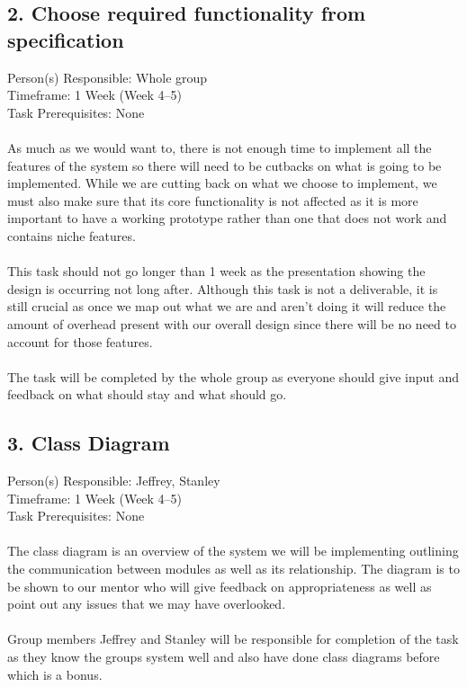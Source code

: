 \subsection{2. Choose required functionality from specification}
\label{chooserequiredfunctionalityfromspecification}

Person(s) Responsible: Whole group
 \\ Timeframe: 1 Week (Week 4--5)
 \\ Task Prerequisites: None
 \\ \\ As much as we would want to, there is not enough time to implement all the features of the system so there will need to be cutbacks on what is going to be implemented. While we are cutting back on what we choose to implement, we must also make sure that its core functionality is not affected as it is more important to have a working prototype rather than one that does not work and contains niche features.
 \\ \\ This task should not go longer than 1 week as the presentation showing the design is occurring not long after. Although this task is not a deliverable, it is still crucial as once we map out what we are and aren't doing it will reduce the amount of overhead present with our overall design since there will be no need to account for those features.
 \\ \\ The task will be completed by the whole group as everyone should give input and feedback on what should stay and what should go.

\subsection{3. Class Diagram}
\label{classdiagram}

Person(s) Responsible: Jeffrey, Stanley
 \\ Timeframe: 1 Week (Week 4--5)
 \\ Task Prerequisites: None
 \\ \\ The class diagram is an overview of the system we will be implementing outlining the communication between modules as well as its relationship. The diagram is to be shown to our mentor who will give feedback on appropriateness as well as point out any issues that we may have overlooked.
 \\ \\ Group members Jeffrey and Stanley will be responsible for completion of the task as they know the groups system well and also have done class diagrams before which is a bonus.

